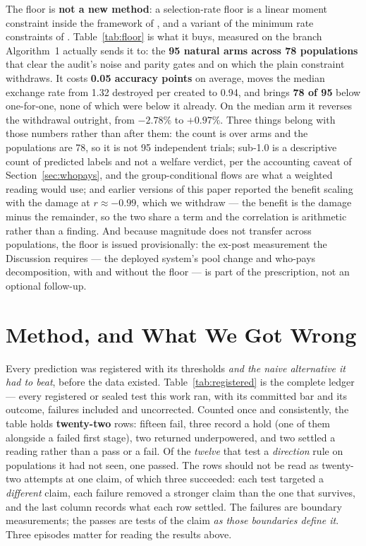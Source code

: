 \documentclass[conference]{IEEEtran}
\begin{document}
The floor is \textbf{not a new method}: a selection-rate floor is a linear moment constraint
inside the framework of \cite{agarwal2018}, and a variant of the minimum rate constraints of
\cite{mittelstadt2023}. Table~\ref{tab:floor} is what it buys, measured on the branch Algorithm~1 actually sends it
to: the \textbf{95 natural arms across 78 populations} that clear the audit's noise and parity
gates and on which the plain constraint withdraws. It costs \textbf{0.05 accuracy points} on
average, moves the median exchange rate from 1.32 destroyed per created to 0.94, and brings \textbf{78 of 95} below one-for-one, none of which were below it already. On the median arm it
reverses the withdrawal outright, from $-2.78\%$ to $+0.97\%$. Three things belong with those
numbers rather than after them: the count is over arms and the populations are 78, so it is not 95 independent trials; sub-1.0 is a descriptive count of predicted labels and not a
welfare verdict, per the accounting caveat of Section~\ref{sec:whopays}, and the
group-conditional flows are what a weighted reading would use; and earlier versions of this
paper reported the benefit scaling with the damage at $r \approx -0.99$, which we withdraw ---
the benefit is the damage minus the remainder, so the two share a term and the correlation is
arithmetic rather than a finding. And because magnitude does not transfer across populations,
the floor is issued provisionally: the ex-post measurement the Discussion requires ---
the deployed system's pool change and who-pays decomposition, with and without the floor
--- is part of the prescription, not an optional follow-up.

\section{Method, and What We Got Wrong}
\label{sec:failures}

Every prediction was registered with its thresholds \emph{and the naive alternative it had to
beat}, before the data existed. Table~\ref{tab:registered} is the complete ledger --- every
registered or sealed test this work ran, with its committed bar and its outcome, failures
included and uncorrected. Counted once and consistently, the table holds \textbf{twenty-two} rows: fifteen fail, three record a hold (one of them alongside a failed first stage), two returned underpowered, and two settled a reading rather than a pass or a fail. Of the \emph{twelve} that test a \emph{direction} rule on populations it had not seen, one
passed. The rows should not be read as twenty-two attempts
at one claim, of which three succeeded: each test targeted a \emph{different} claim, each failure removed a
stronger claim than the one that survives, and the last column records what each row
settled. The failures are boundary measurements; the passes are tests of the claim
\emph{as those boundaries define it}. Three episodes matter for reading the results above.
\end{document}
